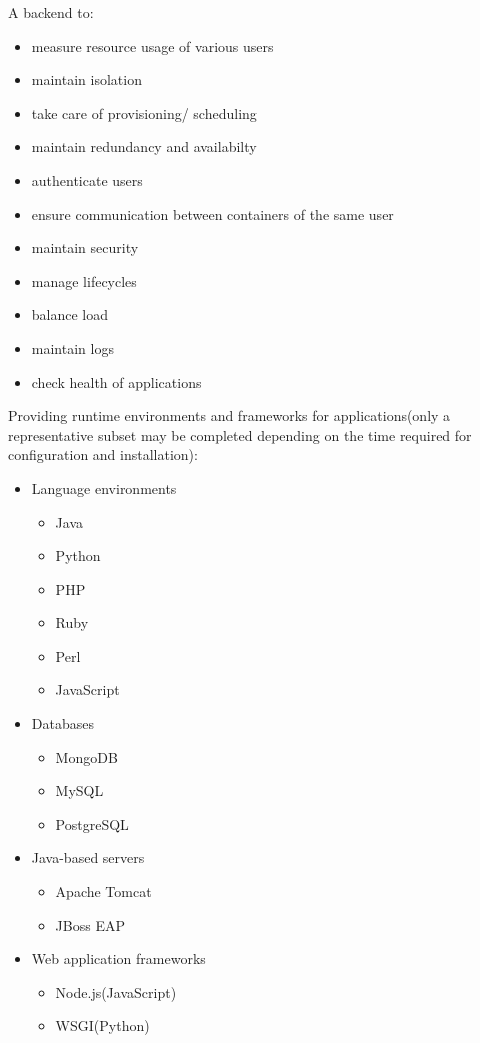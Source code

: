 \documentclass[a4paper]{article}
\begin{document}
  A backend to:
  \begin{itemize}
	  \item measure resource usage of various users
	  \item maintain isolation
	  \item take care of provisioning/ scheduling
	  \item maintain redundancy and availabilty
	  \item authenticate users
	  \item ensure communication between containers of the same user
	  \item maintain security
	  \item manage lifecycles
	  \item balance load
	  \item maintain logs
	  \item check health of applications
  \end{itemize}
  
  Providing runtime environments and frameworks for applications(only a representative subset may be completed depending on the time required for configuration and installation):
	  \begin{itemize}
		  \item Language environments
		  \begin{itemize}
			  \item Java
			  \item Python
			  \item PHP
			  \item Ruby
			  \item Perl
			  \item JavaScript
		  \end{itemize}
		  \item Databases
		  \begin{itemize}
			  \item MongoDB
			  \item MySQL
			  \item PostgreSQL
		  \end{itemize}
		  \item Java-based servers
		  \begin{itemize}
			  \item Apache Tomcat
			  \item JBoss EAP
		  \end{itemize}
		  \item Web application frameworks
		  \begin{itemize}
			  \item Node.js(JavaScript)
			  \item WSGI(Python)
		  \end{itemize}
	  \end{itemize}
	  
\end{document}
